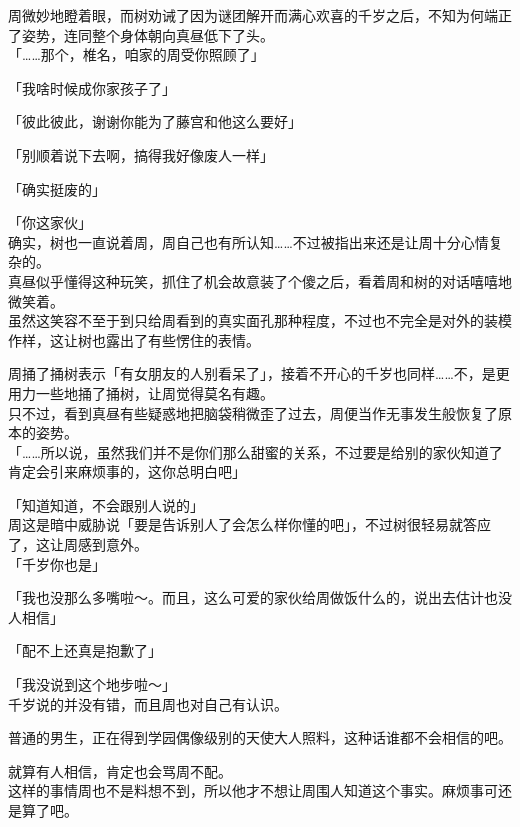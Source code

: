 周微妙地瞪着眼，而树劝诫了因为谜团解开而满心欢喜的千岁之后，不知为何端正了姿势，连同整个身体朝向真昼低下了头。\\

「……那个，椎名，咱家的周受你照顾了」

「我啥时候成你家孩子了」

「彼此彼此，谢谢你能为了藤宫和他这么要好」

「别顺着说下去啊，搞得我好像废人一样」

「确实挺废的」

「你这家伙」\\

确实，树也一直说着周，周自己也有所认知……不过被指出来还是让周十分心情复杂的。\\

真昼似乎懂得这种玩笑，抓住了机会故意装了个傻之后，看着周和树的对话嘻嘻地微笑着。\\

虽然这笑容不至于到只给周看到的真实面孔那种程度，不过也不完全是对外的装模作样，这让树也露出了有些愣住的表情。

周捅了捅树表示「有女朋友的人别看呆了」，接着不开心的千岁也同样……不，是更用力一些地捅了捅树，让周觉得莫名有趣。\\

只不过，看到真昼有些疑惑地把脑袋稍微歪了过去，周便当作无事发生般恢复了原本的姿势。\\

「……所以说，虽然我们并不是你们那么甜蜜的关系，不过要是给别的家伙知道了肯定会引来麻烦事的，这你总明白吧」

「知道知道，不会跟别人说的」\\

周这是暗中威胁说「要是告诉别人了会怎么样你懂的吧」，不过树很轻易就答应了，这让周感到意外。\\

「千岁你也是」

「我也没那么多嘴啦～。而且，这么可爱的家伙给周做饭什么的，说出去估计也没人相信」

「配不上还真是抱歉了」

「我没说到这个地步啦～」\\

千岁说的并没有错，而且周也对自己有认识。

普通的男生，正在得到学园偶像级别的天使大人照料，这种话谁都不会相信的吧。

就算有人相信，肯定也会骂周不配。\\

这样的事情周也不是料想不到，所以他才不想让周围人知道这个事实。麻烦事可还是算了吧。\\

